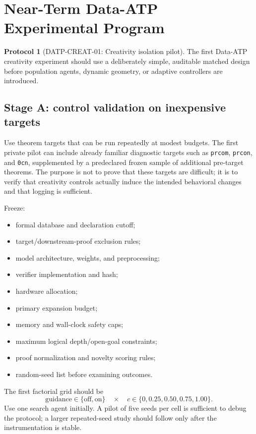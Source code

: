 \documentclass[11pt]{article}
\theoremstyle{datatheorem}
\theoremstyle{definition}
\newtheorem{protocol}{Protocol}[section]
\begin{document}
\section{Near-Term Data-ATP Experimental Program}

\begin{protocol}[DATP-CREAT-01: Creativity isolation pilot]\label{prot:pilot}
The first Data-ATP creativity experiment should use a deliberately simple, auditable matched design before population agents, dynamic geometry, or adaptive controllers are introduced.
\end{protocol}

\subsection{Stage A: control validation on inexpensive targets}

Use theorem targets that can be run repeatedly at modest budgets. The first private pilot can include already familiar diagnostic targets such as \texttt{prcom}, \texttt{prcon}, and \texttt{0cn}, supplemented by a predeclared frozen sample of additional pre-target theorems. The purpose is not to prove that these targets are difficult; it is to verify that creativity controls actually induce the intended behavioral changes and that logging is sufficient.

Freeze:
\begin{itemize}
\item formal database and declaration cutoff;
\item target/downstream-proof exclusion rules;
\item model architecture, weights, and preprocessing;
\item verifier implementation and hash;
\item hardware allocation;
\item primary expansion budget;
\item memory and wall-clock safety caps;
\item maximum logical depth/open-goal constraints;
\item proof normalization and novelty scoring rules;
\item random-seed list before examining outcomes.
\end{itemize}

The first factorial grid should be
\[
\text{guidance}\in\{\text{off},\text{on}\}
\quad\times\quad
c\in\{0,0.25,0.50,0.75,1.00\}.
\]
Use one search agent initially. A pilot of five seeds per cell is sufficient to debug the protocol; a larger repeated-seed study should follow only after the instrumentation is stable.
\end{document}
